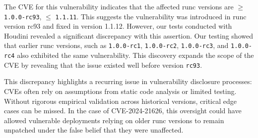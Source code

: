 \begin{doublespace}
The CVE for this vulnerability indicates that the affected runc versions are $\geq$ \texttt{1.0.0-rc93}, $\leq$ \texttt{1.1.11}. This suggests the vulnerability was introduced in runc version rc93 and fixed in version 1.1.12. However, our tests conducted with Houdini revealed a significant discrepancy with this assertion. Our testing showed that earlier runc versions, such as \texttt{1.0.0-rc1}, \texttt{1.0.0-rc2}, \texttt{1.0.0-rc3}, and \texttt{1.0.0-rc4} also exhibited the same vulnerability. This discovery expands the scope of the CVE by revealing that the issue existed well before version \texttt{rc93}.

This discrepancy highlights a recurring issue in vulnerability disclosure processes: CVEs often rely on assumptions from static code analysis or limited testing. Without rigorous empirical validation across historical versions, critical edge cases can be missed. In the case of CVE-2024-21626, this oversight could have allowed vulnerable deployments relying on older runc versions to remain unpatched under the false belief that they were unaffected.



\end{doublespace}
